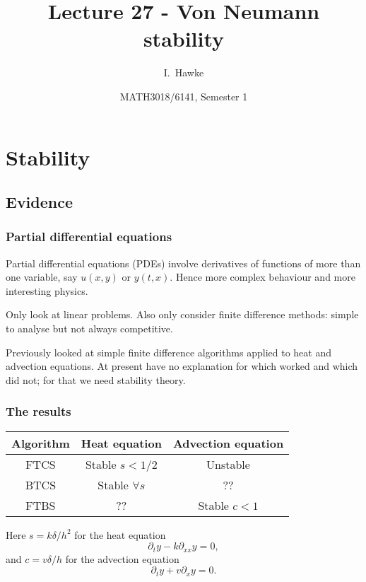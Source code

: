 \documentclass{beamer}
\title[Lecture 27] %
{Lecture 27 - Von Neumann stability}
\author[I. Hawke] %
{I.~Hawke}
\institute[University of Southampton] %
{
  School of Mathematics, \\
  University of Southampton, UK
}
\date[Semester 1] %
{MATH3018/6141, Semester 1}
\begin{document}
\begin{frame}
  \titlepage
\end{frame}

\section{Stability}

\subsection{Evidence}

\begin{frame}
  \frametitle{Partial differential equations}

  Partial differential equations (PDEs) involve derivatives of
  functions of more than one variable, say $u(x, y)$ or $y(t,
  x)$. Hence more complex behaviour and more interesting
  physics. \pause

  \vspace{1ex}

  Only look at linear problems.  Also only consider finite difference
  methods: simple to analyse but not always competitive. \pause

  \vspace{1ex}

  Previously looked at simple finite difference algorithms applied to
  heat and advection equations. At present have no explanation for
  which worked and which did not; for that we need stability theory.

\end{frame}

\begin{frame}
  \frametitle{The results}

  \begin{center}
    \begin{tabular}{c|c c}
      Algorithm & Heat equation & Advection equation \\ \hline
      FTCS & Stable $s < 1/2$ & Unstable \\
      BTCS & Stable $\forall s$ & ?? \\
      FTBS & ?? & Stable $c < 1$
    \end{tabular}
  \end{center}

  Here $s = k \delta / h^2$ for the heat equation
  \begin{equation*}
    \partial_t y - k \partial_{x x} y = 0,
  \end{equation*}
  and $c = v \delta / h$ for the advection equation
  \begin{equation*}
    \partial_t y + v \partial_x y = 0.
  \end{equation*}

\end{frame}
\end{document}

